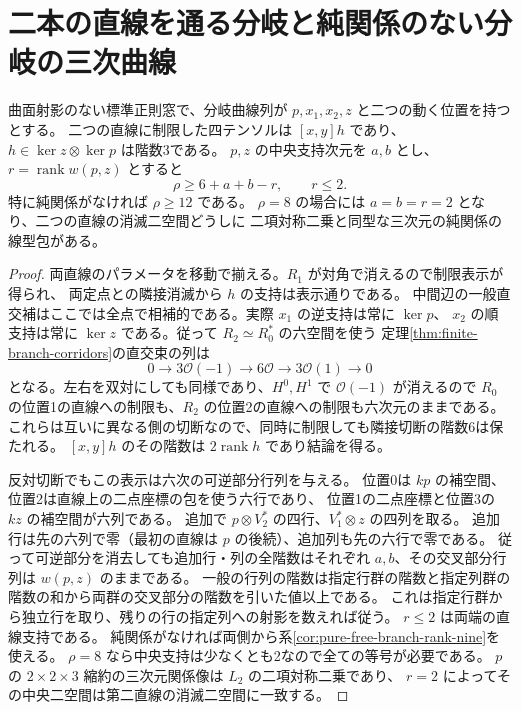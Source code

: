 \section{二本の直線を通る分岐と純関係のない分岐の三次曲線}
\label{sec:two-line-branch-blocks}
\begin{proposition}\label{prop:two-line-branch-block}
曲面射影のない標準正則窓で、分岐曲線列が
$p,x_1,x_2,z$ と二つの動く位置を持つとする。
二つの直線に制限した四テンソルは $[x,y]h$ であり、$h\in\ker z\otimes\ker p$ は階数3である。
$p,z$ の中央支持次元を $a,b$ とし、$r=\operatorname{rank}w(p,z)$ とすると
\[
                        \rho\ge 6+a+b-r,\qquad r\le2 .
\]
特に純関係がなければ $\rho\ge12$ である。
$\rho=8$ の場合には $a=b=r=2$ となり、二つの直線の消滅二空間どうしに
二項対称二乗と同型な三次元の純関係の線型包がある。
\end{proposition}
\begin{proof}
両直線のパラメータを移動で揃える。$R_1$ が対角で消えるので制限表示が得られ、
両定点との隣接消滅から $h$ の支持は表示通りである。
中間辺の一般直交補はここでは全点で相補的である。実際 $x_1$ の逆支持は常に $\ker p$、
$x_2$ の順支持は常に $\ker z$ である。従って $R_2\simeq R_0^*$ の六空間を使う
定理\ref{thm:finite-branch-corridors}の直交束の列は
\[
          0\longrightarrow3\mathcal O(-1)\longrightarrow6\mathcal O
           \longrightarrow3\mathcal O(1)\longrightarrow0
\]
となる。左右を双対にしても同様であり、$H^0,H^1$ で $\mathcal O(-1)$ が消えるので
$R_0$ の位置1の直線への制限も、$R_2$ の位置2の直線への制限も六次元のままである。
これらは互いに異なる側の切断なので、同時に制限しても隣接切断の階数6は保たれる。
$[x,y]h$ のその階数は $2\operatorname{rank}h$ であり結論を得る。

反対切断でもこの表示は六次の可逆部分行列を与える。
位置0は $kp$ の補空間、位置2は直線上の二点座標の包を使う六行であり、
位置1の二点座標と位置3の $kz$ の補空間が六列である。
追加で $p\otimes V_2^*$ の四行、$V_1^*\otimes z$ の四列を取る。
追加行は先の六列で零（最初の直線は $p$ の後続）、追加列も先の六行で零である。
従って可逆部分を消去しても追加行・列の全階数はそれぞれ $a,b$、その交叉部分行列は $w(p,z)$ のままである。
一般の行列の階数は指定行群の階数と指定列群の階数の和から両群の交叉部分の階数を引いた値以上である。
これは指定行群から独立行を取り、残りの行の指定列への射影を数えれば従う。
$r\le2$ は両端の直線支持である。
純関係がなければ両側から系\ref{cor:pure-free-branch-rank-nine}を使える。
$\rho=8$ なら中央支持は少なくとも2なので全ての等号が必要である。
$p$ の $2\times2\times3$ 縮約の三次元関係像は $L_2$ の二項対称二乗であり、
$r=2$ によってその中央二空間は第二直線の消滅二空間に一致する。
\end{proof}

